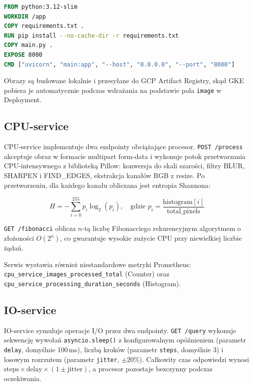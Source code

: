 \begin{lstlisting}[language=Dockerfile, caption={Dockerfile — wzorzec wspólny dla wszystkich serwisów}, label={lst:dockerfile}]
FROM python:3.12-slim
WORKDIR /app
COPY requirements.txt .
RUN pip install --no-cache-dir -r requirements.txt
COPY main.py .
EXPOSE 8000
CMD ["uvicorn", "main:app", "--host", "0.0.0.0", "--port", "8000"]
\end{lstlisting}

Obrazy są budowane lokalnie i przesyłane do GCP Artifact Registry, skąd GKE pobiera je automatycznie podczas wdrażania na podstawie pola \texttt{image} w Deployment.

\subsection{CPU-service}

CPU-service implementuje dwa endpointy obciążające procesor. \texttt{POST /process} akceptuje obraz w formacie multipart form-data i wykonuje potok przetwarzania CPU-intensywnego z biblioteką Pillow: konwersja do skali szarości, filtry BLUR, SHARPEN i FIND\_EDGES, ekstrakcja kanałów RGB z resize. Po przetworzeniu, dla każdego kanału obliczana jest entropia Shannona:

\begin{equation}
  H = -\sum_{i=0}^{255} p_i \log_2(p_i), \quad \text{gdzie } p_i = \frac{\text{histogram}[i]}{\text{total\_pixels}}
\end{equation}

\texttt{GET /fibonacci} oblicza $n$-tą liczbę Fibonacciego rekurencyjnym algorytmem o złożoności $O(2^{n})$, co gwarantuje wysokie zużycie CPU przy niewielkiej liczbie żądań.

Serwis wystawia również niestandardowe metryki Prometheus: \texttt{cpu\_service\_images\_processed\_total} (Counter) oraz \texttt{cpu\_service\_processing\_duration\_seconds} (Histogram).

\subsection{IO-service}

IO-service symuluje operacje I/O przez dwa endpointy. \texttt{GET /query} wykonuje sekwencję wywołań \texttt{asyncio.sleep()} z konfigurowalnym opóźnieniem (parametr \texttt{delay}, domyślnie 100\,ms), liczbą kroków (parametr \texttt{steps}, domyślnie 3) i losowym rozrzutem (parametr \texttt{jitter}, $\pm20\%$). Całkowity czas odpowiedzi wynosi $\text{steps} \times \text{delay} \times (1 \pm \text{jitter})$, a procesor pozostaje bezczynny podczas oczekiwania.

